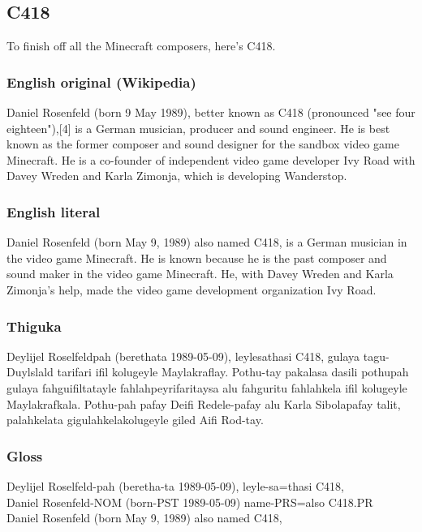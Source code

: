 \newpage

\subsection{C418}
To finish off all the Minecraft composers, here's C418.

\subsubsection*{English original (Wikipedia)}
Daniel Rosenfeld (born 9 May 1989), better known as C418 (pronounced "see four eighteen"),[4] is a German musician, producer and sound engineer.
He is best known as the former composer and sound designer for the sandbox video game Minecraft.
He is a co-founder of independent video game developer Ivy Road with Davey Wreden and Karla Zimonja, which is developing Wanderstop. 

\subsubsection*{English literal}
Daniel Rosenfeld (born May 9, 1989) also named C418, is a German musician in the video game Minecraft.
He is known because he is the past composer and sound maker in the video game Minecraft.
He, with Davey Wreden and Karla Zimonja's help, made the video game development organization Ivy Road.

\subsubsection*{Thiguka}
Deylijel Roselfeldpah (berethata 1989-05-09), leylesathasi C418, gulaya tagu-Duylslald tarifari ifil kolugeyle Maylakraflay.
Pothu-tay pakalasa dasili pothupah gulaya fahguifiltatayle fahlahpeyrifaritaysa alu fahguritu fahlahkela ifil kolugeyle Maylakrafkala.
Pothu-pah pafay Deifi Redele-pafay alu Karla Sibolapafay talit, palahkelata gigulahkelakolugeyle giled Aifi Rod-tay.

\subsubsection*{Gloss}

\begin{exe}
    \ex{} \gll{}Deylijel Roselfeld-pah (beretha-ta 1989-05-09), leyle-sa=thasi C418,\\
                Daniel Rosenfeld-NOM (born-PST 1989-05-09) name-PRS=also C418.PR\\
          \glt{}Daniel Rosenfeld (born May 9, 1989) also named C418,
\end{exe}

